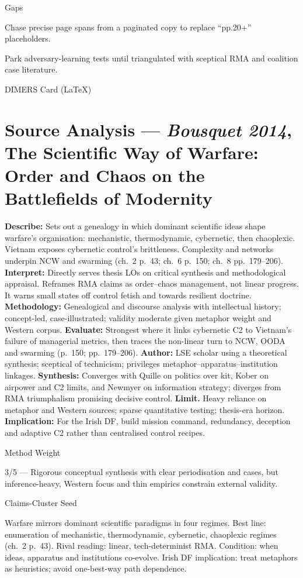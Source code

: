 Gaps

Chase precise page spans from a paginated copy to replace “pp.20+” placeholders.

Park adversary-learning tests until triangulated with sceptical RMA and coalition case literature.

\parencite{BOUSQUET_2014}

DIMERS Card (LaTeX)

\section*{Source Analysis — \textit{Bousquet 2014}, The Scientific Way of Warfare: Order and Chaos on the Battlefields of Modernity}
\textbf{Describe:} Sets out a genealogy in which dominant scientific ideas shape warfare’s organisation: mechanistic, thermodynamic, cybernetic, then chaoplexic. Vietnam exposes cybernetic control’s brittleness. Complexity and networks underpin NCW and swarming (ch.~2 p.~43; ch.~6 p.~150; ch.~8 pp.~179–206).
\textbf{Interpret:} Directly serves thesis LOs on critical synthesis and methodological appraisal. Reframes RMA claims as order–chaos management, not linear progress. It warns small states off control fetish and towards resilient doctrine.
\textbf{Methodology:} Genealogical and discourse analysis with intellectual history; concept-led, case-illustrated; validity moderate given metaphor weight and Western corpus.
\textbf{Evaluate:} Strongest where it links cybernetic C2 to Vietnam’s failure of managerial metrics, then traces the non-linear turn to NCW, OODA and swarming (p.~150; pp.~179–206).
\textbf{Author:} LSE scholar using a theoretical synthesis; sceptical of technicism; privileges metaphor–apparatus–institution linkages.
\textbf{Synthesis:} Converges with Quille on politics over kit, Kober on airpower and C2 limits, and Newmyer on information strategy; diverges from RMA triumphalism promising decisive control.
\textbf{Limit.} Heavy reliance on metaphor and Western sources; sparse quantitative testing; thesis-era horizon.
\textbf{Implication:} For the Irish DF, build mission command, redundancy, deception and adaptive C2 rather than centralised control recipes.

Method Weight

3/5 — Rigorous conceptual synthesis with clear periodisation and cases, but inference-heavy, Western focus and thin empirics constrain external validity.

Claims-Cluster Seed

Warfare mirrors dominant scientific paradigms in four regimes.
Best line: enumeration of mechanistic, thermodynamic, cybernetic, chaoplexic regimes (ch.~2 p.~43).
Rival reading: linear, tech-determinist RMA.
Condition: when ideas, apparatus and institutions co-evolve.
Irish DF implication: treat metaphors as heuristics; avoid one-best-way path dependence.

